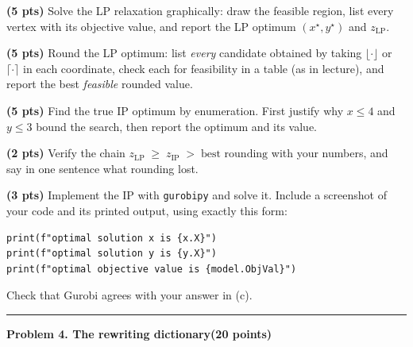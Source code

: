 \documentclass[10pt]{article}
\newcommand{\problem}[2]{%
  \par\bigskip
  {\color{ruleink}\rule{\textwidth}{1pt}}\par\nobreak\vspace{3pt}
  {\large\bfseries #2}\hfill{\normalsize\bfseries(#1 points)}\par\nobreak\vspace{4pt}}
\begin{document}
\begin{parts}
\item \textbf{(5 pts)} Solve the LP relaxation graphically: draw the feasible region,
  list every vertex with its objective value, and report the LP optimum
  $(x^{\star}, y^{\star})$ and $z_{\mathrm{LP}}$.
\item \textbf{(5 pts)} Round the LP optimum: list \emph{every} candidate obtained by
  taking $\lfloor\cdot\rfloor$ or $\lceil\cdot\rceil$ in each coordinate, check each
  for feasibility in a table (as in lecture), and report the best \emph{feasible}
  rounded value.
\item \textbf{(5 pts)} Find the true IP optimum by enumeration. First justify why
  $x \le 4$ and $y \le 3$ bound the search, then report the optimum and its value.
\item \textbf{(2 pts)} Verify the chain
  $z_{\mathrm{LP}} \;\ge\; z_{\mathrm{IP}} \;>\; \text{best rounding}$
  with your numbers, and say in one sentence what rounding lost.
\item \textbf{(3 pts)} Implement the IP with \texttt{gurobipy} and solve it. Include
  a screenshot of your code and its printed output, using exactly this form:
\begin{verbatim}
print(f"optimal solution x is {x.X}")
print(f"optimal solution y is {y.X}")
print(f"optimal objective value is {model.ObjVal}")
\end{verbatim}
  Check that Gurobi agrees with your answer in (c).
\end{parts}

\problem{20}{Problem 4. The rewriting dictionary}
\end{document}
